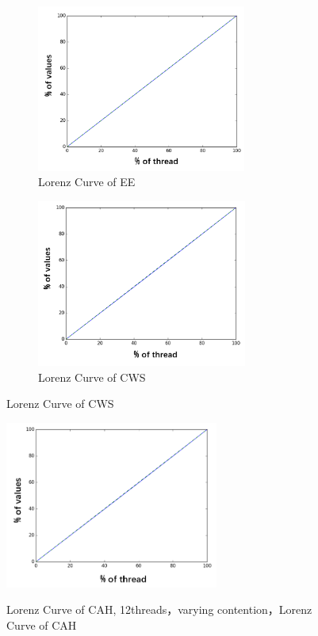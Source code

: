 \begin{figure}[!htp]
  \centering
  \begin{subfigure}{8.0cm}
    \centering
    \includegraphics[height=5.5cm]{figure/EE-varying.png}
    \caption{Lorenz Curve of EE}
  \end{subfigure}
  \hspace{1em}
  \begin{subfigure}{6.0cm}
    \centering
    \includegraphics[height=5.5cm]{figure/CWS-varing.png}
    \caption{Lorenz Curve of CWS}
  \end{subfigure}
  \label{fig:EE-CWS-varying}
\end{figure}

\begin{figure}[t]
	\centering
	\includegraphics[height=5.5cm]{figure/CAH-varying.png}
	\caption{Lorenz Curve of CAH, 12threads，varying contention，Lorenz Curve of CAH}{}
	\label{Fig:CAH-varying}
\end{figure}

